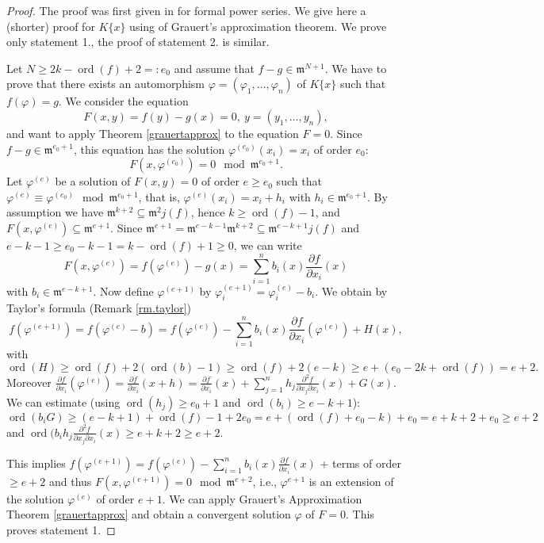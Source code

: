 \documentclass[11pt]{article}
\DeclareMathOperator{\ord}{ord}
\newcommand{\fm}{\mathfrak{m}}
\begin{document}
\begin{proof} The proof was first given in  \cite[Theorem 3]{BGM12} for formal power series. We give here a (shorter) proof for $K\{x\}$ using of Grauert's approximation theorem.
We prove only statement 1., the proof of statement 2. is similar.

Let $N\geq 2k-\ord(f)+2=:e_0$ and assume that $f-g\in \fm^{N+1}$. We have to prove that there exists an automorphism $\varphi=(\varphi_1,\ldots,\varphi_n)$
of $K\{x\}$ such that $f(\varphi)=g$. We consider the equation 
$$F(x,y)=f(y)-g(x)=0, \ y=(y_1,\ldots,y_n),$$
and want to apply Theorem \ref{grauertapprox} to the equation $F=0$. Since $f-g\in \fm^{e_0+1}$,
this equation has the solution $\varphi^{(e_0)}(x_i)=x_i$ of order  $e_0$:
$$F(x,\varphi^{(e_0)})=0 \mod \fm^{e_0+1}.$$
Let $\varphi^{(e)}$ be a solution of $F(x,y)=0$ of order $e \ge e_0$ such that $\varphi^{(e)}\equiv \varphi^{(e_0)} \mod \fm^{e_0+1}$, that is, 
$\varphi^{(e)}(x_i) = x_i + h_i$ with $h_i \in \fm^{e_0+1}. $
By assumption we have 
$\fm^{k+2}\subseteq \fm^2j(f)$,  {hence $k\ge \ord(f) -1$,} and
$F(x,\varphi^{(e)})\subseteq \fm^{e+1}$.
Since $\fm^{e+1} = \fm^{e-k-1}\fm^{k+2} \subseteq \fm^{e-k+1}j(f)$  {and  $e-k-1\ge e_0-k-1=k-\ord(f) +1\ge 0$,}
we can write
$$F(x,\varphi^{(e)})=f(\varphi^{(e)})-g(x)=\sum_{i=1}^nb_i(x)\frac{\partial f}{\partial x_i}(x)$$
with $b_i\in \fm^{e-k+1}$. Now define
$\varphi^{(e+1)}$ by $\varphi^{(e+1)}_i=\varphi^{(e)}_i-b_i$. We obtain by Taylor's formula (Remark \ref{rm.taylor})
$$f(\varphi^{(e+1)})=f(\varphi^{(e)}-b)=f(\varphi^{(e)})-\sum_{i=1}^nb_i(x)\frac{\partial f}{\partial x_i}(\varphi^{(e)})+H(x),$$
with 
$$\ord(H) \ge \ord(f) + 2( \ord(b) -1) \ge \ord(f) + 2( e-k)
\ge e + (e_0-2k +\ord(f)) = e+2.$$
Moreover
$ \frac{\partial f}{\partial x_i}(\varphi^{(e)}) =   \frac{\partial f}{\partial x_i}(x+h) = \frac{\partial f}{\partial x_i}(x) +
 \sum_{j=1}^n h_j \frac{\partial^2 f}{\partial x_j\partial x_i}(x) + G(x)$.
 We can estimate 
(using $\ord (h_j) \ge e_0+1$ and $\ord (b_i)\ge e-k+1$):
$$\ord (b_iG) 
 \ge (e-k+1)+ \ord(f)-1 + 2e_0  =e +(\ord(f) + e_0-k) +e_0= e+ k+2+e_0 \ge e+2$$ 
 and
$\ord(b_ih_j \frac{\partial^2 f}{\partial x_j\partial x_i}(x) \ge  e+k+2 \ge e+2$.
 
This implies $f(\varphi^{(e+1)})=f(\varphi^{(e)})-\sum_{i=1}^nb_i(x)\frac{\partial f}{\partial x_i}(x)$ + terms of order $\ge e+2$ and thus
$F(x,\varphi^{(e+1)})=0 \mod \fm^{e+2}$, i.e.,
$\varphi^{e+1}$ is an extension of the solution $\varphi^{(e)}$ of order $e+1$. We can apply
Grauert's Approximation Theorem \ref{grauertapprox} and obtain a convergent solution $\varphi$ of $F=0$. 
This proves statement 1.
\end{proof}
\end{document}
